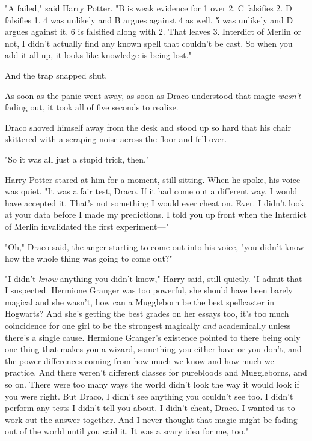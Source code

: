 "A failed," said Harry Potter. "B is weak evidence for 1 over 2. C falsifies 2. 
D falsifies 1. 4 was unlikely and B argues against 4 as well. 5 was unlikely 
and D argues against it. 6 is falsified along with 2. That leaves 3. Interdict 
of Merlin or not, I didn't actually find any known spell that couldn't be cast. 
So when you add it all up, it looks like knowledge is being lost."

And the trap snapped shut.

As soon as the panic went away, as soon as Draco understood that magic 
\emph{wasn't} fading out, it took all of five seconds to realize.

Draco shoved himself away from the desk and stood up so hard that his chair 
skittered with a scraping noise across the floor and fell over.

"So it was all just a stupid trick, then."

Harry Potter stared at him for a moment, still sitting. When he spoke, his 
voice was quiet. "It was a fair test, Draco. If it had come out a different 
way, I would have accepted it. That's not something I would ever cheat on. 
Ever. I didn't look at your data before I made my predictions. I told you up 
front when the Interdict of Merlin invalidated the first experiment---"

"Oh," Draco said, the anger starting to come out into his voice, "you didn't 
know how the whole thing was going to come out?"

"I didn't \emph{know} anything you didn't know," Harry said, still quietly. "I 
admit that I suspected. Hermione Granger was too powerful, she should have been 
barely magical and she wasn't, how can a Muggleborn be the best spellcaster in 
Hogwarts? And she's getting the best grades on her essays too, it's too much 
coincidence for one girl to be the strongest magically \emph{and} academically 
unless there's a single cause. Hermione Granger's existence pointed to there 
being only one thing that makes you a wizard, something you either have or you 
don't, and the power differences coming from how much we know and how much we 
practice. And there weren't different classes for purebloods and Muggleborns, 
and so on. There were too many ways the world didn't look the way it would look 
if you were right. But Draco, I didn't see anything you couldn't see too. I 
didn't perform any tests I didn't tell you about. I didn't cheat, Draco. I 
wanted us to work out the answer together. And I never thought that magic might 
be fading out of the world until you said it. It was a scary idea for me, too."

